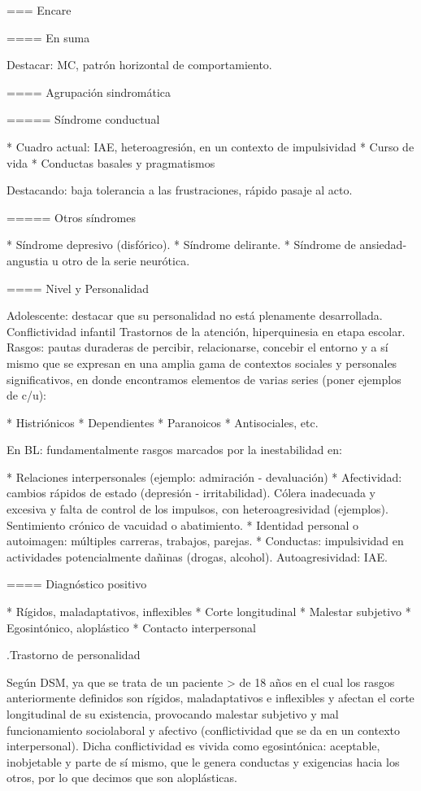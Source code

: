 \documentclass[encares.tex]{subfiles}
\begin{document}
=== Encare

==== En suma

Destacar: MC, patrón horizontal de comportamiento.

==== Agrupación sindromática

===== Síndrome conductual

* Cuadro actual: IAE, heteroagresión, en un contexto de impulsividad
* Curso de vida
* Conductas basales y pragmatismos

Destacando: baja tolerancia a las frustraciones, rápido pasaje al acto.

===== Otros síndromes

* Síndrome depresivo (disfórico).
* Síndrome delirante.
* Síndrome de ansiedad-angustia u otro de la serie neurótica.

==== Nivel y Personalidad

Adolescente: destacar que su personalidad no está plenamente desarrollada. Conflictividad infantil Trastornos de la atención, hiperquinesia en etapa escolar. Rasgos: pautas duraderas de percibir, relacionarse, concebir el entorno y a sí mismo que se expresan en una amplia gama de contextos sociales y personales significativos, en donde encontramos elementos de varias series (poner ejemplos de c/u):

* Histriónicos
* Dependientes
* Paranoicos
* Antisociales, etc.

En BL: fundamentalmente rasgos marcados por la inestabilidad en:

* Relaciones interpersonales (ejemplo: admiración - devaluación)
* Afectividad: cambios rápidos de estado (depresión - irritabilidad). Cólera inadecuada y excesiva y falta de control de los impulsos, con heteroagresividad (ejemplos). Sentimiento crónico de vacuidad o abatimiento.
* Identidad personal o autoimagen: múltiples carreras, trabajos, parejas.
* Conductas: impulsividad en actividades potencialmente dañinas (drogas, alcohol). Autoagresividad: IAE.

==== Diagnóstico positivo

* Rígidos, maladaptativos, inflexibles
* Corte longitudinal
* Malestar subjetivo
* Egosintónico, aloplástico
* Contacto interpersonal

.Trastorno de personalidad

Según DSM, ya que se trata de un paciente > de 18 años en el cual los rasgos anteriormente definidos son rígidos, maladaptativos e inflexibles y afectan el corte longitudinal de su existencia, provocando malestar subjetivo y mal funcionamiento sociolaboral y afectivo (conflictividad que se da en un contexto interpersonal). Dicha conflictividad es vivida como egosintónica: aceptable, inobjetable y parte de sí mismo, que le genera conductas y exigencias hacia los otros, por lo que decimos que son aloplásticas.
\end{document}
